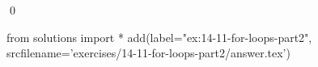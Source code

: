 
\begin{ex}
  \label{ex:14-11-for-loops-part2}
  
  \qed
\end{ex}
\begin{python0}
from solutions import *
add(label="ex:14-11-for-loops-part2",
    srcfilename='exercises/14-11-for-loops-part2/answer.tex')
\end{python0}
